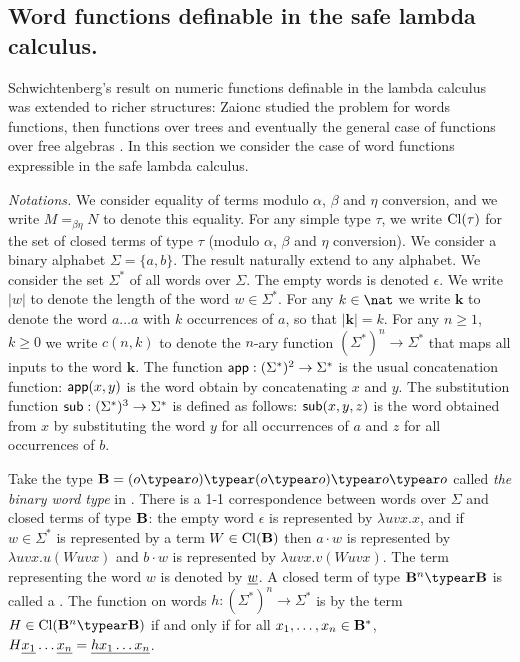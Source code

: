 \newcommand\wordnum[1]{\mathbf{#1}} %
\newcommand\safedefset{$\lambda^{safe}${\rm def}}

\newcommand\fatlambda{\lambda\kern-0.7em\lambda}
\newcommand\wordapp{{\sf app}}
\newcommand\wordsub{{\sf sub}}


\subsection{Word functions definable in the safe lambda calculus.}
Schwichtenberg's result on numeric functions definable in the lambda
calculus was extended to richer structures: Zaionc studied the
problem for words functions, then functions over trees and
eventually the general case of functions over free algebras
\cite{DBLP:journals/tcs/Leivant93,DBLP:journals/apal/Zaionc91,702481,DBLP:journals/tcs/Zaionc87,
zaionc:csl94}. In this section we consider the case of word
functions expressible in the safe lambda calculus.
\smallskip

\emph{Notations.} We consider equality of terms modulo $\alpha$,
$\beta$ and $\eta$ conversion, and we write $M=_{\beta\eta} N$ to
denote this equality. For any simple type $\tau$, we write
${\rm Cl}(\tau)$ for the set of closed terms of type $\tau$ (modulo
$\alpha$, $\beta$ and $\eta$ conversion). We consider a binary
alphabet $\Sigma = \{a,b\}$. The result naturally extend to any
alphabet. We consider the set $\Sigma^*$ of all words over $\Sigma$.
The empty words is denoted $\epsilon$. We write $|w|$ to denote the
length of the word $w\in\Sigma^*$. For any $k\in \nat$ we write
$\wordnum{k}$ to denote the word $a \ldots a$ with $k$ occurrences
of $a$, so that $|\wordnum{k}| = k$. For any $n\geq 1$, $k\geq 0$ we
write $c(n,k)$ to denote the $n$-ary function $(\Sigma^*)^n
\rightarrow \Sigma^*$ that maps all inputs to the word
$\wordnum{k}$. The function $\wordapp : (\Sigma^*)^2 \rightarrow
\Sigma^*$ is the usual concatenation function: $\wordapp(x,y)$ is
the word obtain by concatenating $x$ and $y$. The substitution
function $\wordsub : (\Sigma^*)^3 \rightarrow \Sigma^*$ is defined
as follows: $\wordsub(x,y,z)$ is the word obtained from $x$ by
substituting the word $y$ for all occurrences of $a$ and $z$ for all
occurrences of $b$.

Take the type $\zaiwordtyp = (o\typear o)\typear (o\typear o)\typear
o\typear o$ called \emph{the binary word type} in
\cite{DBLP:journals/tcs/Zaionc87}. There is a 1-1 correspondence
between words over $\Sigma$ and closed terms of type $\mathbf{B}$:
the empty word $\epsilon$ is represented by $\lambda u v x.x$, and
if $w\in \Sigma^*$ is represented by a term $W \in
{\rm Cl}(\mathbf{B})$ then $a \cdot w$ is represented by $\lambda
u v x. u(W uvx)$ and $b \cdot w$ is represented by $\lambda u v x.
v(W uvx)$. The term representing the word $w$ is denoted by
$\underline{w}$. A closed term of type $\zaiwordtyp^n \typear
\zaiwordtyp$ is called a . The function on words $h:(\Sigma^*)^n \rightarrow
\Sigma^*$ is  by the term $H \in
\closedof{\zaiwordtyp^n \typear \zaiwordtyp}$ if and only if for all
$x_1, \ldots, x_n \in \mathbf{B}^*$, $H \underline{x_1} \ldots
\underline{x_n} = \underline{h x_1 \ldots x_n}$. \bigskip

